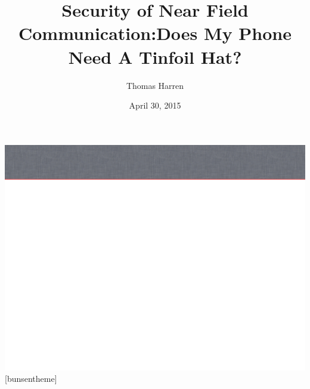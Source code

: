 \documentclass[unknownkeysallowed]{beamer}
\title{Security of Near Field Communication:\break Does My Phone Need A Tinfoil Hat?}
\author{Thomas Harren}
\institute[UMM] %
{
  University of Minnesota, Morris
}
\date[]{April 30, 2015}
\begin{document}
\begin{frame}
  \titlepage
\end{frame}

 {\includegraphics[width=\paperwidth,height=\paperheight]{slide_bg}}
[bunsentheme]
\end{document}
